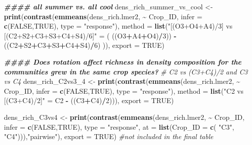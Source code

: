 \documentclass[
]{article}
\newenvironment{Shaded}{\begin{snugshade}}{\end{snugshade}}
\newcommand{\AttributeTok}[1]{\textcolor[rgb]{0.13,0.29,0.53}{#1}}
\newcommand{\CommentTok}[1]{\textcolor[rgb]{0.56,0.35,0.01}{\textit{#1}}}
\newcommand{\ConstantTok}[1]{\textcolor[rgb]{0.56,0.35,0.01}{#1}}
\newcommand{\DecValTok}[1]{\textcolor[rgb]{0.00,0.00,0.81}{#1}}
\newcommand{\DocumentationTok}[1]{\textcolor[rgb]{0.56,0.35,0.01}{\textbf{\textit{#1}}}}
\newcommand{\FunctionTok}[1]{\textcolor[rgb]{0.13,0.29,0.53}{\textbf{#1}}}
\newcommand{\NormalTok}[1]{#1}
\newcommand{\OtherTok}[1]{\textcolor[rgb]{0.56,0.35,0.01}{#1}}
\newcommand{\SpecialCharTok}[1]{\textcolor[rgb]{0.81,0.36,0.00}{\textbf{#1}}}
\newcommand{\StringTok}[1]{\textcolor[rgb]{0.31,0.60,0.02}{#1}}
\begin{document}
\begin{Shaded}
\begin{Highlighting}[]
\DocumentationTok{\#\#\#\# all summer vs. all cool}
\NormalTok{dens\_rich\_summer\_vs\_cool }\OtherTok{\textless{}{-}} \FunctionTok{print}\NormalTok{(}\FunctionTok{contrast}\NormalTok{(}\FunctionTok{emmeans}\NormalTok{(dens\_rich.lmer2, }\SpecialCharTok{\textasciitilde{}}\NormalTok{ Crop\_ID,}
                                                   \AttributeTok{infer =} \FunctionTok{c}\NormalTok{(}\ConstantTok{FALSE}\NormalTok{,}\ConstantTok{TRUE}\NormalTok{),}
                                                   \AttributeTok{type =} \StringTok{"response"}\NormalTok{), }
                                           \AttributeTok{method =} \FunctionTok{list}\NormalTok{(}\StringTok{"[(O3+O4+A4)/3] vs [(C2+S2+C3+S3+C4+S4)/6]"} \OtherTok{=}
\NormalTok{                                                           ( ((O3}\SpecialCharTok{+}\NormalTok{A4}\SpecialCharTok{+}\NormalTok{O4)}\SpecialCharTok{/}\DecValTok{3}\NormalTok{)) }\SpecialCharTok{{-}}\NormalTok{ ((C2}\SpecialCharTok{+}\NormalTok{S2}\SpecialCharTok{+}\NormalTok{C3}\SpecialCharTok{+}\NormalTok{S3}\SpecialCharTok{+}\NormalTok{C4}\SpecialCharTok{+}\NormalTok{S4)}\SpecialCharTok{/}\DecValTok{6}\NormalTok{) )),}
                                  \AttributeTok{export =} \ConstantTok{TRUE}\NormalTok{)}


\DocumentationTok{\#\#\#\# Does rotation affect richness in density composition for the communities grew in the same crop species?  }
\CommentTok{\# C2 vs (C3+C4)/2 and C3 vs C4}
\NormalTok{dens\_rich\_C2vs3\_4 }\OtherTok{\textless{}{-}} \FunctionTok{print}\NormalTok{(}\FunctionTok{contrast}\NormalTok{(}\FunctionTok{emmeans}\NormalTok{(dens\_rich.lmer2, }\SpecialCharTok{\textasciitilde{}}\NormalTok{ Crop\_ID,}
                                            \AttributeTok{infer =} \FunctionTok{c}\NormalTok{(}\ConstantTok{FALSE}\NormalTok{,}\ConstantTok{TRUE}\NormalTok{), }
                                            \AttributeTok{type =} \StringTok{"response"}\NormalTok{),}
                                    \AttributeTok{method =} \FunctionTok{list}\NormalTok{(}\StringTok{"C2 vs [(C3+C4)/2]"} \OtherTok{=}\NormalTok{ C2 }\SpecialCharTok{{-}}\NormalTok{ ((C3}\SpecialCharTok{+}\NormalTok{C4)}\SpecialCharTok{/}\DecValTok{2}\NormalTok{))),}
                           \AttributeTok{export =} \ConstantTok{TRUE}\NormalTok{)}


\NormalTok{dens\_rich\_C3vs4 }\OtherTok{\textless{}{-}} \FunctionTok{print}\NormalTok{(}\FunctionTok{contrast}\NormalTok{(}\FunctionTok{emmeans}\NormalTok{(dens\_rich.lmer2, }\SpecialCharTok{\textasciitilde{}}\NormalTok{ Crop\_ID, }
                                          \AttributeTok{infer =} \FunctionTok{c}\NormalTok{(}\ConstantTok{FALSE}\NormalTok{,}\ConstantTok{TRUE}\NormalTok{), }
                                          \AttributeTok{type =} \StringTok{"response"}\NormalTok{, }
                                          \AttributeTok{at =} \FunctionTok{list}\NormalTok{(}\AttributeTok{Crop\_ID =} \FunctionTok{c}\NormalTok{( }\StringTok{"C3"}\NormalTok{, }\StringTok{"C4"}\NormalTok{))),}\StringTok{"pairwise"}\NormalTok{), }\AttributeTok{export =} \ConstantTok{TRUE}\NormalTok{) }\CommentTok{\#not included in the final table}



\end{Highlighting}
\end{Shaded}
\end{document}
